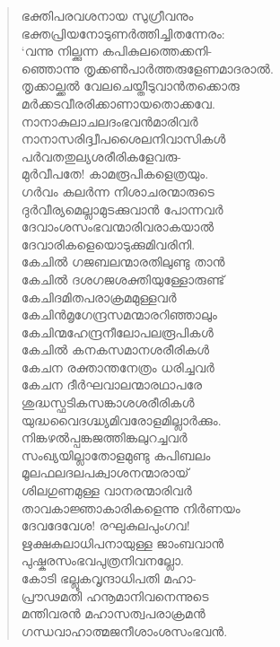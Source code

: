 \begin{verse}
ഭക്തിപരവശനായ സുഗ്രീവനും\\
ഭക്തപ്രിയനോടുണര്‍ത്തിച്ചിതന്നേരം:\\
‘വന്നു നില്ക്കുന്ന കപികുലത്തെക്കനി-\\
ഞ്ഞൊന്നു തൃക്കണ്‍പാര്‍ത്തരുളേണമാദരാല്‍.\\
തൃക്കാല്ക്കല്‍ വേലചെയ്തീടുവാന്‍തക്കൊരു\\
മര്‍ക്കടവീരരിക്കാണായതൊക്കവേ.\\
നാനാകുലാചലദംഭവന്‍മാരിവര്‍\\
നാനാസരിദ്ദ്വീപശൈലനിവാസികള്‍\\
പര്‍വതതുല്യശരീരികളേവരു-\\
മുര്‍വീപതേ! കാമരൂപികളെത്രയും.\\
ഗര്‍വം കലര്‍ന്ന നിശാചരന്മാരുടെ\\
ദുര്‍വീര്യമെല്ലാമുടക്കുവാന്‍ പോന്നവര്‍\\
ദേവാംശസംഭവന്മാരിവരാകയാല്‍\\
ദേവാരികളെയൊടുക്കുമിവരിനി.\\
കേചില്‍ ഗജബലന്മാരതിലുണ്ടു താന്‍\\
കേചില്‍ ദശഗജശക്തിയുള്ളോരുണ്ട്\\
കേചിദമിതപരാക്രമമുള്ളവര്‍\\
കേചിന്‍മൃഗേന്ദ്രസമന്മാരറിഞ്ഞാലും\\
കേചിന്മഹേന്ദ്രനീലോപലരൂപികള്‍\\
കേചില്‍ കനകസമാനശരീരികള്‍\\
കേചന രക്താന്തനേത്രം ധരിച്ചവര്‍\\
കേചന ദീര്‍ഘവാലന്മാരഥാപരേ\\
ശുദ്ധസ്ഫടികസങ്കാശശരീരികള്‍\\
യുദ്ധവൈദഗ്ദ്ധ്യമിവരോളമില്ലാര്‍ക്കും.\\
നിങ്കഴല്‍പ്പങ്കജത്തിങ്കലുറച്ചവര്‍\\
സംഖ്യയില്ലാതോളമുണ്ടു കപിബലം\\
മൂലഫലദലപക്വാശനന്മാരായ്\\
ശിലഗുണമുള്ള വാനരന്മാരിവര്‍\\
താവകാജ്ഞാകാരികളെന്നു നിര്‍ണയം\\
ദേവദേവേശ! രഘുകുലപുംഗവ!\\
ഋക്ഷകുലാധിപനായുള്ള ജാംബവാന്‍\\
പുഷ്കരസംഭവപുത്രനിവനല്ലോ.\\
കോടി ഭല്ലൂകവൃന്ദാധിപതി മഹാ-\\
പ്രൗഢമതി ഹനൂമാനിവനെന്നുടെ\\
മന്തിവരന്‍ മഹാസത്വപരാക്രമന്‍\\
ഗന്ധവാഹാത്മജനീശാംശസംഭവന്‍.\\

\end{verse}
